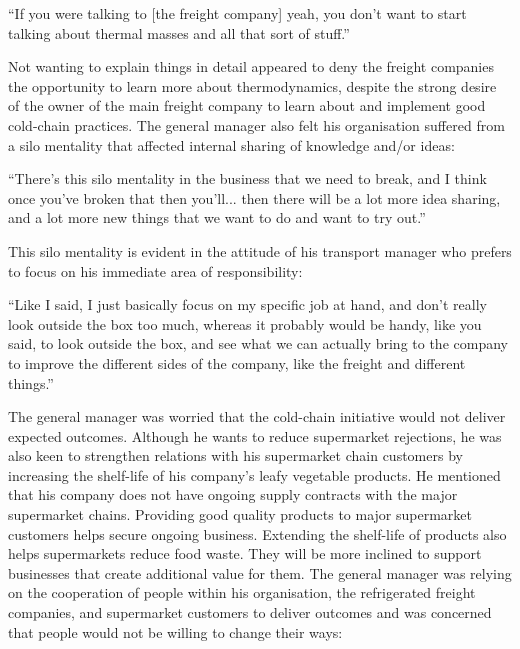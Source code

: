\begin{displayquote}[Participant 15/1]
\small
\enquote{If you were talking to [the freight company] yeah, you don't want to start talking about thermal masses and all that sort of stuff.} 
\end{displayquote}
 

Not wanting to explain things in detail appeared to deny the freight companies the opportunity to learn more about thermodynamics, despite the strong desire of the owner of the main freight company to learn about and implement good cold-chain practices. The general manager also felt his organisation suffered from a silo mentality that affected internal sharing of knowledge and/or ideas: 

\begin{displayquote}[Participant 1/1]
\small
\enquote{There’s this silo mentality in the business that we need to break, and I think once you've broken that then you'll... then there will be a lot more idea sharing, and a lot more new things that we want to do and want to try out.} 
\end{displayquote}
 

This silo mentality is evident in the attitude of his transport manager who prefers to focus on his immediate area of responsibility: 

\begin{displayquote}[Participant 3/1]
\small
\enquote{Like I said, I just basically focus on my specific job at hand, and don't really look outside the box too much, whereas it probably would be handy, like you said, to look outside the box, and see what we can actually bring to the company to improve the different sides of the company, like the freight and different things.} 
\end{displayquote}
 

The general manager was worried that the cold-chain initiative would not deliver expected outcomes. Although he wants to reduce supermarket rejections, he was also keen to strengthen relations with his supermarket chain customers by increasing the shelf-life of his company's leafy vegetable products. He mentioned that his company does not have ongoing supply contracts with the major supermarket chains. Providing good quality products to major supermarket customers helps secure ongoing business. Extending the shelf-life of products also helps supermarkets reduce food waste. They will be more inclined to support businesses that create additional value for them. The general manager was relying on the cooperation of people within his organisation, the refrigerated freight companies, and supermarket customers to deliver outcomes and was concerned that people would not be willing to change their ways:

